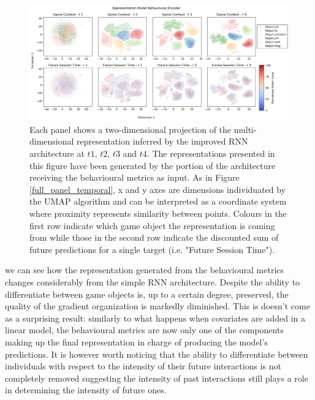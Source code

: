 \begin{figure}[!htb]
\centering
\includegraphics[width=\textwidth]{images/chapter_4/RNN_env_even_0_lstm_layer_features_Future Session Time.png}
\caption[\textbf{Lower dimensional representation of the latent representations generated by the improved version of the RNN architecture from the behavioural metrics}]{Each panel shows a two-dimensional projection of the multi-dimensional representation inferred by the improved RNN architecture at $t1$, $t2$, $t3$ and $t4$. The representations presented in this figure have been generated by the portion of the architecture receiving the behavioural metrics as input. As in Figure \ref{full_panel_temporal}, x and y axes are dimensions individuated by the UMAP algorithm and can be interpreted as a coordinate system where proximity represents similarity between points. Colours in the first row indicate which game object the representation is coming from while those in the second row indicate the discounted sum of future predictions for a single target (i.e. "Future Session Time").}
\label{rnn_env_even_full_beha}
\end{figure}

we can see how the representation generated from the behavioural metrics changes considerably from the simple RNN architecture. Despite the ability to differentiate between game objects is, up to a certain degree, preserved, the quality of the gradient organization is markedly diminished. This is doesn't come as a surprising result: similarly to what happens when covariates are added in a linear model, the behavioural metrics are now only one of the components making up the final representation in charge of producing the model's predictions. It is however worth noticing that the ability to differentiate between individuals with respect to the intensity of their future interactions is not completely removed suggesting the intensity of past interactions still plays a role in determining the intensity of future ones. 

